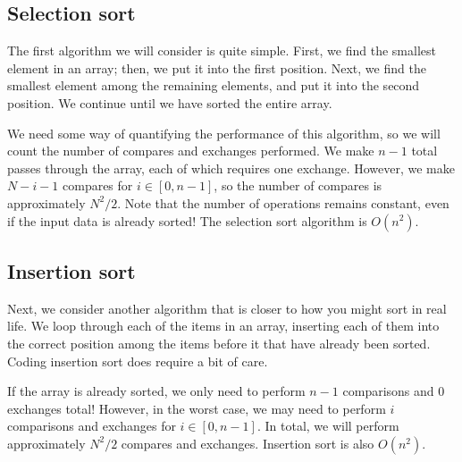 \subsection{Selection sort}

The first algorithm we will consider is quite simple. First, we find the smallest element in an array; then, we put it into the first position. Next, we find the smallest element among the remaining elements, and put it into the second position. We continue until we have sorted the entire array.

We need some way of quantifying the performance of this algorithm, so we will count the number of compares and exchanges performed. We make $n-1$ total passes through the array, each of which requires one exchange. However, we make $N-i-1$ compares for $i \in [0, n-1]$, so the number of compares is approximately $N^2/2$. Note that the number of operations remains constant, even if the input data is already sorted!  The selection sort algorithm is $ O(n^2) $.


\subsection{Insertion sort}

Next, we consider another algorithm that is closer to how you might sort in real life. We loop through each of the items in an array, inserting each of them into the correct position among the items before it that have already been sorted. Coding insertion sort does require a bit of care.

If the array is already sorted, we only need to perform $n-1$ comparisons and $0$ exchanges total! However, in the worst case, we may need to perform $i$ comparisons and exchanges for $i \in [0, n-1]$. In total, we will perform approximately $N^2/2$ compares and exchanges.  Insertion sort is also $ O(n^2) $.

